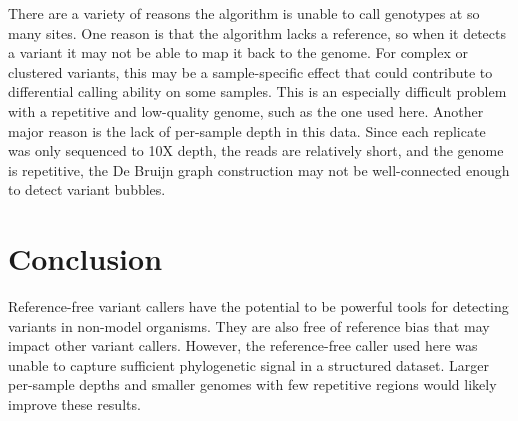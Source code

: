 There are a variety of reasons the algorithm is unable to call genotypes at so many sites. One reason is that the algorithm lacks a reference, so when it detects a variant it may not be able to map it back to the genome. For complex or clustered variants, this may be a sample-specific effect that could contribute to differential calling ability on some samples. This is an especially difficult problem with a repetitive and low-quality genome, such as the one used here. Another major reason is the lack of per-sample depth in this data. Since each replicate was only sequenced to 10X depth, the reads are relatively short, and the genome is repetitive, the De Bruijn graph construction may not be well-connected enough to detect variant bubbles.

\section{Conclusion}

Reference-free variant callers have the potential to be powerful tools for detecting variants in non-model organisms. They are also free of reference bias that may impact other variant callers. However, the reference-free caller used here was unable to capture sufficient phylogenetic signal in a structured dataset. Larger per-sample depths and smaller genomes with few repetitive regions would likely improve these results.

\printbibliography[segment=\therefsegment]{}
